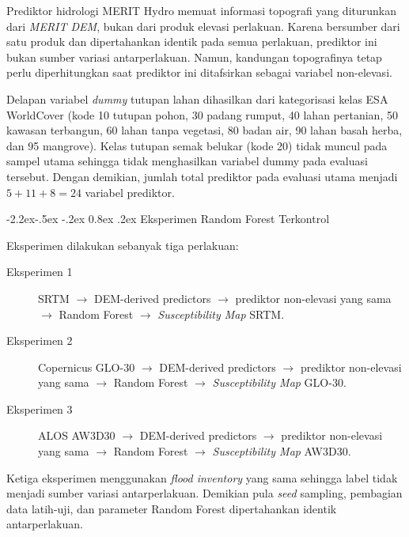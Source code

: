 \documentclass[12pt,a4paper]{article}
\makeatletter
\renewcommand\subsection{\@startsection{subsection}{2}{\z@}%
  {-2.2ex\@plus -.5ex \@minus -.2ex}%
  {0.8ex \@plus .2ex}%
  {\normalfont\normalsize\bfseries}}
\makeatother
\begin{document}
Prediktor hidrologi MERIT Hydro memuat informasi topografi yang
diturunkan dari \textit{MERIT DEM}, bukan dari produk elevasi perlakuan.
Karena bersumber dari satu produk dan dipertahankan identik pada semua
perlakuan, prediktor ini bukan sumber variasi antarperlakuan. Namun,
kandungan topografinya tetap perlu diperhitungkan saat prediktor ini
ditafsirkan sebagai variabel non-elevasi.

Delapan variabel \textit{dummy} tutupan lahan dihasilkan dari
kategorisasi kelas ESA WorldCover \citep{zanaga2021} (kode 10 tutupan pohon,
30 padang rumput, 40 lahan pertanian, 50 kawasan terbangun, 60 lahan tanpa
vegetasi, 80 badan air, 90 lahan basah herba, dan 95 mangrove). Kelas
tutupan semak belukar (kode 20) tidak muncul pada sampel utama sehingga tidak
menghasilkan variabel dummy pada evaluasi tersebut. Dengan demikian, jumlah
total prediktor pada evaluasi utama menjadi
$5+11+8=24$ variabel prediktor.

\subsection{Eksperimen Random Forest Terkontrol}

Eksperimen dilakukan sebanyak tiga perlakuan:

\begin{description}
\item[Eksperimen 1] SRTM $\rightarrow$ DEM-derived predictors $\rightarrow$
prediktor non-elevasi yang sama $\rightarrow$ Random Forest $\rightarrow$
\textit{Susceptibility Map} SRTM.
\item[Eksperimen 2] Copernicus GLO-30 $\rightarrow$ DEM-derived predictors
$\rightarrow$ prediktor non-elevasi yang sama $\rightarrow$ Random Forest
$\rightarrow$ \textit{Susceptibility Map} GLO-30.
\item[Eksperimen 3] ALOS AW3D30 $\rightarrow$ DEM-derived predictors
$\rightarrow$ prediktor non-elevasi yang sama $\rightarrow$ Random Forest
$\rightarrow$ \textit{Susceptibility Map} AW3D30.
\end{description}

Ketiga eksperimen menggunakan \textit{flood inventory} yang sama sehingga
label tidak menjadi sumber variasi antarperlakuan. Demikian pula \textit{seed}
sampling, pembagian data latih-uji, dan parameter Random Forest dipertahankan
identik antarperlakuan.
\end{document}
